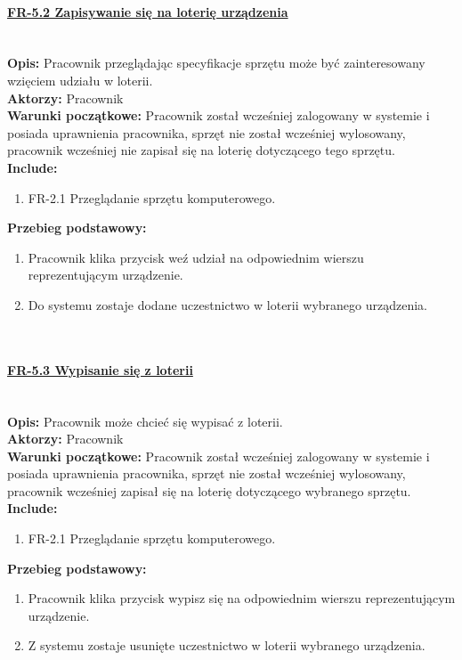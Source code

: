 \paragraph{\underline{FR-5.2 Zapisywanie się na loterię urządzenia}}\mbox{}\\[1mm]
	\noindent\textbf{Opis:} Pracownik przeglądając specyfikacje sprzętu może być zainteresowany wzięciem udziału w loterii.\\
	\noindent\textbf{Aktorzy:} Pracownik\\
	\textbf{Warunki początkowe:} Pracownik został wcześniej zalogowany w systemie i posiada uprawnienia pracownika, sprzęt nie został wcześniej wylosowany, pracownik wcześniej nie zapisał się na loterię dotyczącego tego sprzętu.\\
	\textbf{Include:} 
	\begin{enumerate}[noparskip]
		\item FR-2.1 Przeglądanie sprzętu komputerowego.
	\end{enumerate}
  \textbf{Przebieg podstawowy:}
	\begin{enumerate}[noparskip]
		\item Pracownik klika przycisk weź udział na odpowiednim wierszu reprezentującym urządzenie.
		\item Do systemu zostaje dodane uczestnictwo w loterii wybranego urządzenia.
  \end{enumerate} \mbox{}\\[-11mm]

\paragraph{\underline{FR-5.3 Wypisanie się z loterii}}\mbox{}\\[1mm]
	\noindent\textbf{Opis:} Pracownik może chcieć się wypisać z loterii.\\
	\noindent\textbf{Aktorzy:} Pracownik\\
	\textbf{Warunki początkowe:} Pracownik został wcześniej zalogowany w systemie i posiada uprawnienia pracownika, sprzęt nie został wcześniej wylosowany, pracownik wcześniej zapisał się na loterię dotyczącego wybranego sprzętu.\\
	\textbf{Include:} 
	\begin{enumerate}[noparskip]
		\item FR-2.1 Przeglądanie sprzętu komputerowego.
	\end{enumerate}
  \textbf{Przebieg podstawowy:}
	\begin{enumerate}[noparskip]
		\item Pracownik klika przycisk wypisz się na odpowiednim wierszu reprezentującym urządzenie.
		\item Z systemu zostaje usunięte uczestnictwo w loterii wybranego urządzenia.
  \end{enumerate} \mbox{}\\[-11mm]

